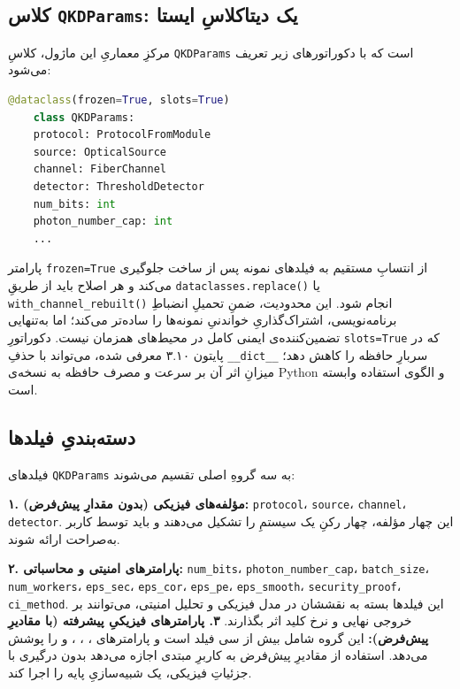 \subsection{کلاس \texttt{QKDParams}: یک دیتاکلاسِ ایستا}

مرکزِ معماریِ این ماژول، کلاسِ \texttt{QKDParams} است که با دکوراتورهای زیر تعریف می‌شود:

\begin{lstlisting}[language=Python]
	@dataclass(frozen=True, slots=True)
	class QKDParams:
	protocol: ProtocolFromModule
	source: OpticalSource
	channel: FiberChannel
	detector: ThresholdDetector
	num_bits: int
	photon_number_cap: int
	...
\end{lstlisting}



پارامتر \texttt{frozen=True} از انتسابِ مستقیم به فیلدهای نمونه پس از ساخت جلوگیری می‌کند و هر اصلاح باید از طریقِ \texttt{dataclasses.replace()} یا \texttt{with\_channel\_rebuilt()} انجام شود. این محدودیت، ضمنِ تحمیلِ انضباطِ برنامه‌نویسی، اشتراک‌گذاریِ خواندنیِ نمونه‌ها را ساده‌تر می‌کند؛ اما به‌تنهایی تضمین‌کننده‌ی ایمنی کامل در محیط‌های همزمان نیست. دکوراتورِ \texttt{slots=True} که در پایتون ۳.۱۰ معرفی شده، می‌تواند با حذفِ \texttt{\_\_dict\_\_} سربارِ حافظه را کاهش دهد؛ میزانِ اثر آن بر سرعت و مصرف حافظه به نسخه‌ی Python و الگوی استفاده وابسته است.

\subsection{دسته‌بندیِ فیلدها}

فیلدهای \texttt{QKDParams} به سه گروهِ اصلی تقسیم می‌شوند:

\textbf{۱. مؤلفه‌های فیزیکی (بدون مقدارِ پیش‌فرض):} \texttt{protocol}، \texttt{source}، \texttt{channel}، \texttt{detector}. این چهار مؤلفه، چهار رکنِ یک سیستمِ  را تشکیل می‌دهند و باید توسط کاربر به‌صراحت ارائه شوند.

\textbf{۲. پارامترهای امنیتی و محاسباتی:} \texttt{num\_bits}، \texttt{photon\_number\_cap}، \texttt{batch\_size}، \texttt{num\_workers}، \texttt{eps\_sec}، \texttt{eps\_cor}، \texttt{eps\_pe}، \texttt{eps\_smooth}، \texttt{security\_proof}، \texttt{ci\_method}. این فیلدها بسته به نقششان در مدل فیزیکی و تحلیل امنیتی، می‌توانند بر خروجی نهایی و نرخ کلید اثر بگذارند.
\textbf{۳. پارامترهای فیزیکیِ پیشرفته (با مقادیرِ پیش‌فرض):} این گروه شامل بیش از سی فیلد است و پارامترهای ، ، ،  و  را پوشش می‌دهد. استفاده از مقادیرِ پیش‌فرض به کاربرِ مبتدی اجازه می‌دهد بدون درگیری با جزئیاتِ فیزیکی، یک شبیه‌سازیِ پایه را اجرا کند.

